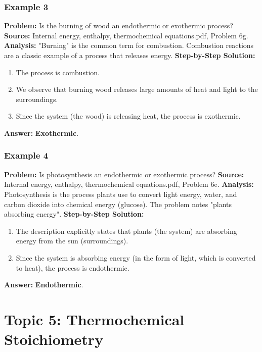 \documentclass{article}
\begin{document}
\subsubsection{Example 3}
\textbf{Problem:} Is the burning of wood an endothermic or exothermic process?
\textbf{Source:} Internal energy, enthalpy, thermochemical equations.pdf, Problem 6g.
\textbf{Analysis:} "Burning" is the common term for combustion. Combustion reactions are a classic example of a process that releases energy.
\textbf{Step-by-Step Solution:}
\begin{enumerate}
    \item The process is combustion.
    \item We observe that burning wood releases large amounts of heat and light to the surroundings.
    \item Since the system (the wood) is releasing heat, the process is exothermic.
\end{enumerate}
\textbf{Answer:} \textbf{Exothermic}.

\subsubsection{Example 4}
\textbf{Problem:} Is photosynthesis an endothermic or exothermic process?
\textbf{Source:} Internal energy, enthalpy, thermochemical equations.pdf, Problem 6e.
\textbf{Analysis:} Photosynthesis is the process plants use to convert light energy, water, and carbon dioxide into chemical energy (glucose). The problem notes "plants absorbing energy".
\textbf{Step-by-Step Solution:}
\begin{enumerate}
    \item The description explicitly states that plants (the system) are absorbing energy from the sun (surroundings).
    \item Since the system is absorbing energy (in the form of light, which is converted to heat), the process is endothermic.
\end{enumerate}
\textbf{Answer:} \textbf{Endothermic}.

\section{Topic 5: Thermochemical Stoichiometry}
\end{document}
